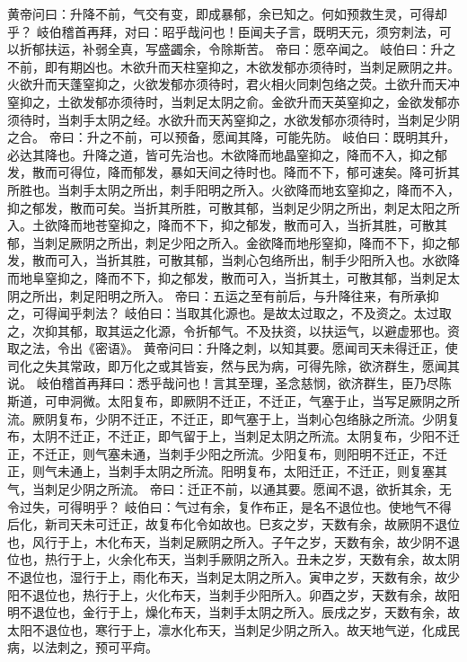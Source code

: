 \documentclass[a4paper,12pt,UTF8,twoside]{ctexbook}
\begin{document}
黄帝问曰：升降不前，气交有变，即成暴郁，余已知之。何如预救生灵，可得却乎？
岐伯稽首再拜，对曰：昭乎哉问也！臣闻夫子言，既明天元，须穷刺法，可以折郁扶运，补弱全真，写盛蠲余，令除斯苦。
帝曰：愿卒闻之。
岐伯曰：升之不前，即有期凶也。木欲升而天柱窒抑之，木欲发郁亦须待时，当刺足厥阴之井。火欲升而天蓬窒抑之，火欲发郁亦须待时，君火相火同刺包络之荧。土欲升而天冲窒抑之，土欲发郁亦须待时，当刺足太阴之俞。金欲升而天英窒抑之，金欲发郁亦须待时，当刺手太阴之经。水欲升而天芮窒抑之，水欲发郁亦须待时，当刺足少阴之合。
帝曰：升之不前，可以预备，愿闻其降，可能先防。
岐伯曰：既明其升，必达其降也。升降之道，皆可先治也。木欲降而地晶窒抑之，降而不入，抑之郁发，散而可得位，降而郁发，暴如天间之待时也。降而不下，郁可速矣。降可折其所胜也。当刺手太阴之所出，刺手阳明之所入。火欲降而地玄窒抑之，降而不入，抑之郁发，散而可矣。当折其所胜，可散其郁，当刺足少阴之所出，刺足太阳之所入。土欲降而地苍窒抑之，降而不下，抑之郁发，散而可入，当折其胜，可散其郁，当刺足厥阴之所出，刺足少阳之所入。金欲降而地彤窒抑，降而不下，抑之郁发，散而可入，当折其胜，可散其郁，当刺心包络所出，制手少阳所入也。水欲降而地阜窒抑之，降而不下，抑之郁发，散而可入，当折其土，可散其郁，当刺足太阴之所出，刺足阳明之所入。
帝曰：五运之至有前后，与升降往来，有所承抑之，可得闻乎刺法？
岐伯曰：当取其化源也。是故太过取之，不及资之。太过取之，次抑其郁，取其运之化源，令折郁气。不及扶资，以扶运气，以避虚邪也。资取之法，令出《密语》。
黄帝问曰：升降之刺，以知其要。愿闻司天未得迁正，使司化之失其常政，即万化之或其皆妄，然与民为病，可得先除，欲济群生，愿闻其说。
岐伯稽首再拜曰：悉乎哉问也！言其至理，圣念慈悯，欲济群生，臣乃尽陈斯道，可申洞微。太阳复布，即厥阴不迁正，不迁正，气塞于止，当写足厥阴之所流。厥阴复布，少阴不迁正，不迁正，即气塞于上，当刺心包络脉之所流。少阴复布，太阴不迁正，不迁正，即气留于上，当刺足太阴之所流。太阴复布，少阳不迁正，不迁正，则气塞未通，当刺手少阳之所流。少阳复布，则阳明不迁正，不迁正，则气未通上，当刺手太阴之所流。阳明复布，太阳迁正，不迁正，则复塞其气，当刺足少阴之所流。
帝曰：迁正不前，以通其要。愿闻不退，欲折其余，无令过失，可得明乎？
岐伯曰：气过有余，复作布正，是名不退位也。使地气不得后化，新司天未可迁正，故复布化令如故也。巳亥之岁，天数有余，故厥阴不退位也，风行于上，木化布天，当刺足厥阴之所入。子午之岁，天数有余，故少阴不退位也，热行于上，火余化布天，当刺手厥阴之所入。丑未之岁，天数有余，故太阴不退位也，湿行于上，雨化布天，当刺足太阴之所入。寅申之岁，天数有余，故少阳不退位也，热行于上，火化布天，当刺手少阳所入。卯酉之岁，天数有余，故阳明不退位也，金行于上，燥化布天，当刺手太阴之所入。辰戌之岁，天数有余，故太阳不退位也，寒行于上，凛水化布天，当刺足少阴之所入。故天地气逆，化成民病，以法刺之，预可平疴。
\end{document}
